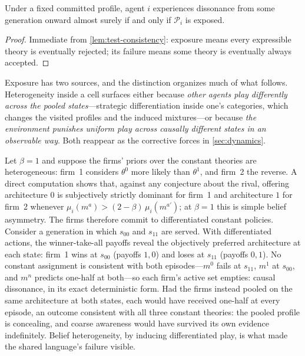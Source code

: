\begin{proposition}
\label{prop:exposure}
Under a fixed committed profile, agent $i$ experiences dissonance from some
generation onward almost surely if and only if $\mathcal P_i$ is exposed.
\end{proposition}

\begin{proof}
Immediate from \cref{lem:test-consistency}: exposure means every expressible
theory is eventually rejected; its failure means some theory is eventually
always accepted.
\end{proof}

Exposure has two sources, and the distinction organizes much of what
follows.  Heterogeneity inside a cell surfaces either because \emph{other
agents play differently across the pooled states}---strategic
differentiation inside one's categories, which changes the visited profiles
and the induced mixtures---or because \emph{the environment punishes uniform
play across causally different states in an observable way}.  Both reappear
as the corrective forces in \cref{sec:dynamics}.

\begin{excont}
Let $\beta=1$ and suppose the firms' priors over the constant theories are
heterogeneous: firm~1 considers $\theta^0$ more likely than $\theta^1$, and
firm~2 the reverse.  A direct computation shows that, against any conjecture
about the rival, offering architecture $0$ is subjectively strictly dominant
for firm~1 and architecture $1$ for firm~2 whenever
$\mu_i(m^a)>(2-\beta)\,\mu_i(m^{a'})$; at $\beta=1$ this is simple belief
asymmetry.  The firms therefore commit to differentiated constant policies.
Consider a generation in which $s_{00}$ and $s_{11}$ are served.  With
differentiated actions, the winner-take-all payoffs reveal the objectively
preferred architecture at each state: firm~1 wins at $s_{00}$ (payoffs
$1,0$) and loses at $s_{11}$ (payoffs $0,1$).  No constant assignment is
consistent with both episodes---$m^0$ fails at $s_{11}$, $m^1$ at $s_{00}$,
and $m^n$ predicts one-half at both---so each firm's active set empties:
causal dissonance, in its exact deterministic form.  Had the firms instead
pooled on the same architecture at both states, each would have received
one-half at every episode, an outcome consistent with all three constant
theories: the pooled profile is concealing, and coarse awareness would have
survived its own evidence indefinitely.  Belief heterogeneity, by inducing
differentiated play, is what made the shared language's failure visible.
\end{excont}
